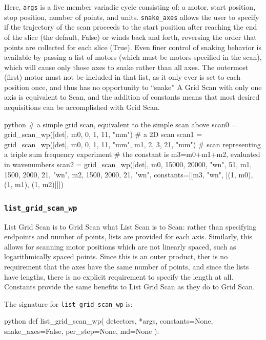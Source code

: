 Here, \texttt{args} is a five member variadic cycle consisting of: a motor, start position, stop position, number of points, and units.
\texttt{snake\_axes} allows the user to specify if the trajectory of the scan proceeds to the start position after reaching the end of the slice (the default, False) or winds back and forth, reversing the order that points are collected for each slice (True).
Even finer control of snaking behavior is available by passing a list of motors (which must be motors specified in the scan), which will cause only those axes to snake rather than all axes.
The outermost (first) motor must not be included in that list, as it only ever is set to each position once, and thus has no opportunity to ``snake''
A Grid Scan with only one axis is equivalent to Scan, and the addition of constants means that most desired acquisitions can be accomplished with Grid Scan.

\begin{codefragment}{python}
# a simple grid scan, equivalent to the simple scan above
scan0 = grid_scan_wp([det], m0, 0, 1, 11, "mm")
# a 2D scan
scan1 = grid_scan_wp([det], m0, 0, 1, 11, "mm",
                            m1, 2, 3, 21, "mm")
# scan representing a triple sum frequency experiment
# the constant is m3=m0+m1+m2, evaluated in wavenumbers
scan2 = grid_scan_wp([det], m0, 15000, 20000, "wn", 51,
                            m1, 1500, 2000, 21, "wn",
                            m2, 1500, 2000, 21, "wn",
                            constants=[[m3, "wn", [(1, m0), (1, m1), (1, m2)]]])
\end{codefragment}

\subsubsection{\texttt{list\_grid\_scan\_wp}}

List Grid Scan is to Grid Scan what List Scan is to Scan: rather than specifying endpoints and number of points, lists are provided for each axis.
Similarly, this allows for scanning motor positions which are not linearly spaced, such as logarithmically spaced points.
Since this is an outer product, ther is no requirement that the axes have the same number of points, and since the lists have lengths, there is no explicit requirement to specify the length at all.
Constants provide the same benefits to List Grid Scan as they do to Grid Scan.

The signature for \texttt{list\_grid\_scan\_wp} is:

\begin{codefragment}{python}
def list_grid_scan_wp(
    detectors, *args, constants=None, snake_axes=False, per_step=None, md=None
):
\end{codefragment}

